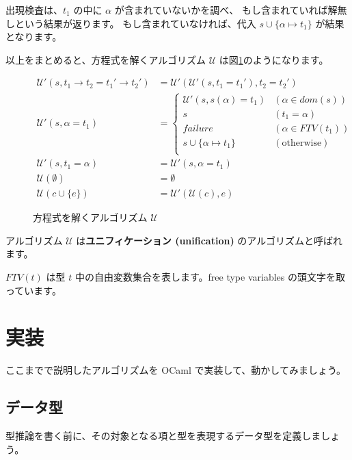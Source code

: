 出現検査は、$t_1$ の中に $\alpha$ が含まれていないかを調べ、
もし含まれていれば解無しという結果が返ります。
もし含まれていなければ、代入 $s \cup \{\alpha \mapsto t_1\}$ が結果となります。

以上をまとめると、方程式を解くアルゴリズム $\mathcal U$ は図\ref{fig:algorithm-s}のようになります。

\begin{figure}[htbp]
 \begin{align*}
  \mathcal{U'}(s, t_1 \to t_2 = t_1' \to t_2') &=
   \mathcal{U'}(\mathcal{U'}(s, t_1 = t_1'), t_2 = t_2') \\
  \mathcal{U'}(s, \alpha = t_1) &=
   \left \{
    \begin{array}{ll}
     \mathcal{U'}(s, s(\alpha) = t_1) & (\alpha \in \mathit{dom}(s)) \\
     s                                & (t_1 = \alpha) \\
     \textit{failure}                 & (\alpha \in \mathit{FTV}(t_1)) \\
     s \cup \{\alpha \mapsto t_1\}    & (\text{otherwise}) \\
    \end{array}
   \right . \\
  \mathcal{U'}(s, t_1 = \alpha) &= \mathcal{U'}(s, \alpha = t_1) \\
  \mathcal{U}(\emptyset) &= \emptyset \\
  \mathcal{U}(c \cup \{e\}) &= \mathcal{U'}(\mathcal{U}(c), e)
 \end{align*}
 \caption{方程式を解くアルゴリズム $\mathcal U$}
 \label{fig:algorithm-s}
\end{figure}

アルゴリズム $\mathcal U$ は\textbf{ユニフィケーション (unification)} のアルゴリズムと呼ばれます。

$\mathit{FTV}(t)$ は型 $t$ 中の自由変数集合を表します。free type variables の頭文字を取っています。

\section{実装}

ここまでで説明したアルゴリズムを OCaml で実装して、動かしてみましょう。

\subsection{データ型}

型推論を書く前に、その対象となる項と型を表現するデータ型を定義しましょう。

